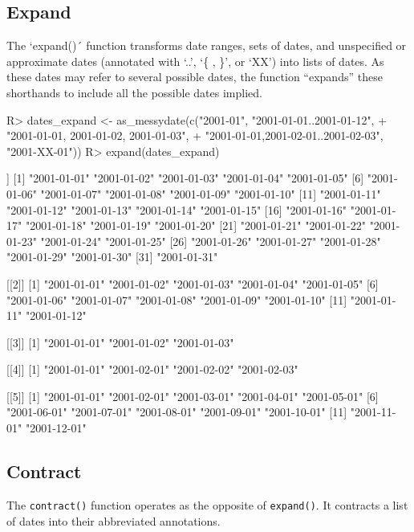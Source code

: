 \documentclass[
]{jss}
\begin{document}
\hypertarget{expand}{%
\subsection{Expand}\label{expand}}

The `expand()´ function transforms date ranges, sets of dates, and
unspecified or approximate dates (annotated with `..', `\{ , \}', or
`XX') into lists of dates. As these dates may refer to several possible
dates, the function ``expands'' these shorthands to include all the
possible dates implied.

\begin{CodeChunk}
\begin{CodeInput}
R> dates_expand <- as_messydate(c("2001-01", "2001-01-01..2001-01-12",
+                                "{2001-01-01, 2001-01-02, 2001-01-03}",
+                                "{2001-01-01,2001-02-01..2001-02-03}", "2001-XX-01"))
R> expand(dates_expand)
\end{CodeInput}
\begin{CodeOutput}
[[1]]
 [1] "2001-01-01" "2001-01-02" "2001-01-03" "2001-01-04" "2001-01-05"
 [6] "2001-01-06" "2001-01-07" "2001-01-08" "2001-01-09" "2001-01-10"
[11] "2001-01-11" "2001-01-12" "2001-01-13" "2001-01-14" "2001-01-15"
[16] "2001-01-16" "2001-01-17" "2001-01-18" "2001-01-19" "2001-01-20"
[21] "2001-01-21" "2001-01-22" "2001-01-23" "2001-01-24" "2001-01-25"
[26] "2001-01-26" "2001-01-27" "2001-01-28" "2001-01-29" "2001-01-30"
[31] "2001-01-31"

[[2]]
 [1] "2001-01-01" "2001-01-02" "2001-01-03" "2001-01-04" "2001-01-05"
 [6] "2001-01-06" "2001-01-07" "2001-01-08" "2001-01-09" "2001-01-10"
[11] "2001-01-11" "2001-01-12"

[[3]]
[1] "2001-01-01" "2001-01-02" "2001-01-03"

[[4]]
[1] "2001-01-01" "2001-02-01" "2001-02-02" "2001-02-03"

[[5]]
 [1] "2001-01-01" "2001-02-01" "2001-03-01" "2001-04-01" "2001-05-01"
 [6] "2001-06-01" "2001-07-01" "2001-08-01" "2001-09-01" "2001-10-01"
[11] "2001-11-01" "2001-12-01"
\end{CodeOutput}
\end{CodeChunk}

\hypertarget{contract}{%
\subsection{Contract}\label{contract}}

The \texttt{contract()} function operates as the opposite of
\texttt{expand()}. It contracts a list of dates into their abbreviated
annotations.
\end{document}
